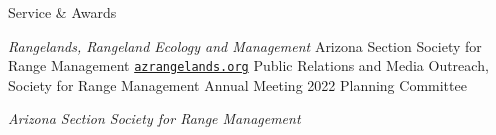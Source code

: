 \begin{rubric}{Service \& Awards}

    \emph{Rangelands, Rangeland Ecology and Management}
%
    Arizona Section Society for Range Management {\faGlobe}{\href{https://azrangelands.org/}{\texttt{azrangelands.org}}}
%
    Public Relations and Media Outreach, Society for Range Management Annual Meeting 2022 Planning Committee

    \emph{Arizona Section Society for Range Management}

\end{rubric}